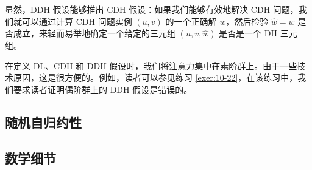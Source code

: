 显然，DDH 假设能够推出 CDH 假设：如果我们能够有效地解决 CDH 问题，我们就可以通过计算 CDH 问题实例 $(u,v)$ 的一个正确解 $w$，然后检验 $\hat{w}=w$ 是否成立，来轻而易举地确定一个给定的三元组 $(u,v,\hat{w})$ 是否是一个 DH 三元组。

\vspace*{10pt}

在定义 DL、CDH 和 DDH 假设时，我们将注意力集中在素阶群上。由于一些技术原因，这是很方便的。例如，读者可以参见练习 \ref{exer:10-22}，在该练习中，我们要求读者证明偶阶群上的 DDH 假设是错误的。

\subsection{随机自归约性}\label{subsec:10-5-1}

\begin{theorem}\label{theo:10-2}
	
\end{theorem}

\subsection{数学细节}\label{subsec:10-5-2}

\begin{definition}[群族]\label{def:10-9}
	
\end{definition}